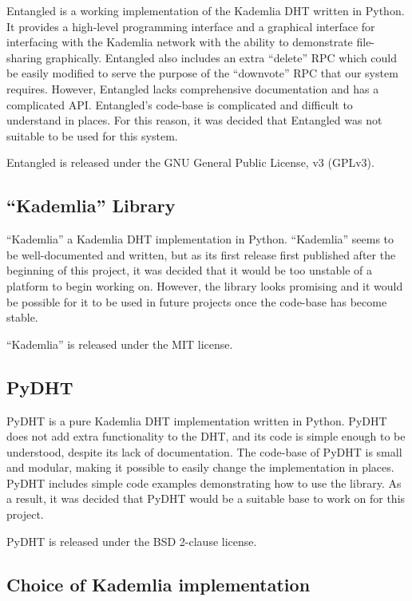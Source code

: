 Entangled is a working implementation of the Kademlia DHT written in Python. It provides a high-level programming interface and
a graphical interface for interfacing with the Kademlia network with the ability to demonstrate file-sharing graphically.
Entangled also includes an extra ``delete'' RPC which could be easily modified to serve the purpose of the ``downvote'' RPC
that our system requires. However, Entangled lacks comprehensive documentation and has a complicated API.
Entangled's code-base is complicated and difficult to understand in places. For this reason, it was decided that Entangled
was not suitable to be used for this system.

Entangled is released under the GNU General Public License, v3 (GPLv3).

\subsection{``Kademlia'' Library}

``Kademlia'' a Kademlia DHT implementation in Python. ``Kademlia'' seems to be well-documented and written,
but as its first release first published after the beginning of this project, it was decided that it would be too unstable of
a platform to begin working on. However, the library looks promising and it would be possible for it to be used in future projects
once the code-base has become stable.

``Kademlia'' is released under the MIT license.

\subsection{PyDHT}

PyDHT is a pure Kademlia DHT implementation written in Python. PyDHT does not add extra functionality to the DHT, and its code
is simple enough to be understood, despite its lack of documentation. The code-base of PyDHT is small and modular, making
it possible to easily change the implementation in places. PyDHT includes simple code examples demonstrating how to use the
library. As a result, it was decided that PyDHT would be a suitable base to work on for this project.

PyDHT is released under the BSD 2-clause license.

\subsection{Choice of Kademlia implementation}

